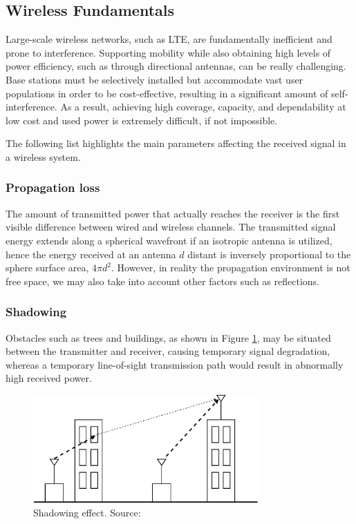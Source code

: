 \subsection{Wireless Fundamentals}

Large-scale wireless networks, such as LTE, are fundamentally inefficient and prone to 
interference. Supporting mobility while also obtaining high levels of power efficiency, 
such as through directional antennas, can be really challenging. Base stations must be 
selectively installed but accommodate vast user populations in order to be cost-effective, 
resulting in a significant amount of self-interference. As a result, achieving high coverage, 
capacity, and dependability at low cost and used power is extremely difficult, if not impossible.

The following list highlights the main parameters affecting the received signal in a wireless system. 


\subsubsection{Propagation loss} 

The amount of transmitted power that actually reaches the receiver is the first visible 
difference between wired and wireless channels. The transmitted signal energy extends along 
a spherical wavefront if an isotropic antenna is utilized, hence the energy received at an 
antenna ${d}$ distant is inversely proportional to the sphere surface area, ${4\pi d^2}$.
However, in reality the propagation environment is not free space, we may also take into
account other factors such as reflections.

\subsubsection{Shadowing} 

Obstacles such as trees and buildings, as shown in Figure \ref{fig:pathloss}, may be situated between the 
transmitter and receiver, causing temporary signal degradation, whereas a temporary line-of-sight 
transmission path would result in abnormally high received power.

\begin{figure}[]
  \centering
  \includegraphics[width=0.77\textwidth]{img/pathloss.png}
  \caption{Shadowing effect. Source:\cite{lte2} }
  \label{fig:pathloss}
\end{figure}


